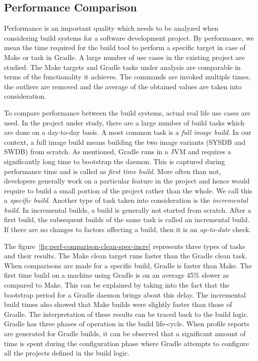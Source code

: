 \documentclass[12pt, a4paper, titlepage]{scrartcl}
\begin{document}
\subsection{Performance Comparison}
\par Performance is an important quality which needs to be analyzed when considering build systems for a software development project. By performance, we mean the time required for the build tool to perform a specific target in case of Make or task in Gradle. A large number of use cases in the existing project are studied. The Make targets and Gradle tasks under analysis are comparable in terms of the functionality it achieves. The commands are invoked multiple times, the outliers are removed and the average of the obtained values are taken into consideration.
\par To compare performance between the build systems, actual real life use cases are used. In the project under study, there are a large number of build tasks which are done on a day-to-day basis. A most common task is a \emph{full image build}. In our context, a full image build means building the two image variants (SYSDB and SWDB) from scratch. As mentioned, Gradle runs in a JVM and requires a significantly long time to bootstrap the daemon. This is captured during performance time and is called as \emph{first time build}. More often than not, developers generally work on a particular feature in the project and hence would require to build a small portion of the project rather than the whole. We call this a \emph{specific build}. Another type of task taken into consideration is the \emph{incremental build}. In incremental builds, a build is generally not started from scratch. After a first build, the subsequent builds of the same task is called an incremental build. If there are no changes to factors affecting a build, then it is an \emph{up-to-date} check. 
\par The figure~\ref{fig:perf-comparison-clean-spec-incre} represents three types of tasks and their results. The Make clean target runs faster than the Gradle clean task. When comparisons are made for a specific build, Gradle is faster than Make. The first time build on a machine using Gradle is on an average 45\% slower as compared to Make. This can be explained by taking into the fact that the bootstrap period for a Gradle daemon brings about this delay. The incremental build times also showed that Make builds were slightly faster than those of Gradle. The interpretation of these results can be traced back to the build logic. Gradle has three phases of operation in the build life-cycle. When profile reports are generated for Gradle builds, it can be observed that a significant amount of time is spent during the configuration phase where Gradle attempts to configure all the projects defined in the build logic. 
\end{document}
